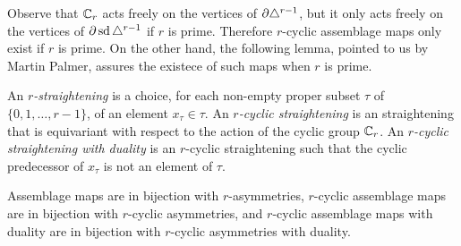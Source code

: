 
Observe that $\mathbb{C}_r$ acts freely on the vertices of $\partial \triangle^{r-1}$, but it only acts freely on the vertices of $\partial \operatorname{sd}\triangle^{r-1}$ if $r$ is prime. Therefore $r$-cyclic assemblage maps only exist if $r$ is prime. On the other hand, the following lemma, pointed to us by Martin Palmer, assures the existece of such maps when $r$ is prime.

\begin{definition}
	An \emph{$r$-straightening} is a choice, for each non-empty proper subset $\tau$ of $\{0,1,\dots,r-1\}$, of an element $x_\tau\in \tau$. An \emph{$r$-cyclic straightening} is an straightening that is equivariant with respect to the action of the cyclic group $\mathbb{C}_r$. An \emph{$r$-cyclic straightening with duality} is an $r$-cyclic straightening such that the cyclic predecessor of $x_\tau$ is not an element of $\tau$.
\end{definition}

\begin{lemma}\label{lemma:straightening}
	Assemblage maps are in bijection with $r$-asymmetries, $r$-cyclic assemblage maps are in bijection with $r$-cyclic asymmetries, and $r$-cyclic assemblage maps with duality are in bijection with $r$-cyclic asymmetries with duality.
\end{lemma}

